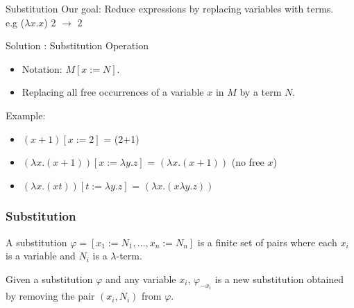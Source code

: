\documentclass{beamer}
\begin{document}

\begin{frame}{Substitution}
  Our goal: Reduce expressions by replacing variables with terms.\\
  e.g ($\lambda x.x$) 2 $\to$ 2\\
  \vspace{1em}
  \begin{block}{}
  Solution : Substitution Operation
  \end{block}
  \begin{itemize}
    \item Notation: $M[x := N]$.
    \item Replacing all free occurrences of a variable $x$ in $M$ by a term $N$.
  \end{itemize}
  Example:
  \begin{itemize}
    \item  $(x+1)[x:= 2]$ = (2+1)
    \item $(\lambda x.(x+1))[x:= \lambda y.z]$ = $(\lambda x.(x+1))$ (no free $x$)\\
    \item $(\lambda x.(xt))[t:= \lambda y.z]$ = $(\lambda x.(x \lambda y.z))$ \\
  \end{itemize}
\end{frame}

\begin{frame}
  \frametitle{Substitution}

  \begin{definition}
    A substitution $\varphi = [x_1 := N_1, \ldots, x_n := N_n]$ is a finite set of pairs where each \(x_i\) is a variable and \(N_i\) is a $\lambda$-term.\\
  \end{definition}
  \begin{definition}
    Given a substitution \(\varphi\) and any variable \(x_i\), \(\varphi_{-x_i}\) is a new substitution obtained by removing the pair \((x_i, N_i)\) from \(\varphi\).\\
  \end{definition}

\end{frame}
\end{document}
